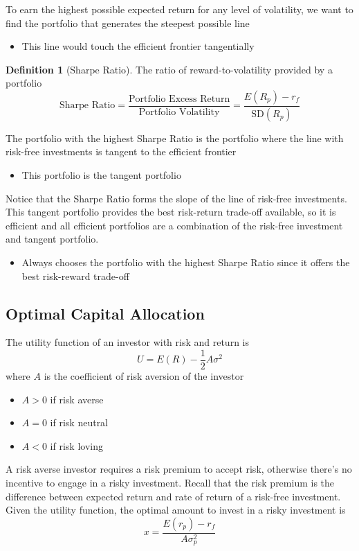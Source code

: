 \documentclass[11pt]{article}
\theoremstyle{definition}
\newtheorem*{definition}{Definition}
\newcommand{\Sd}{\text{SD}}
\begin{document}
To earn the highest possible expected return for any level of volatility, we want to find the portfolio that generates the steepest possible line 
\begin{itemize}
    \item This line would touch the efficient frontier tangentially
\end{itemize}
\begin{definition}[Sharpe Ratio]
    The ratio of reward-to-volatility provided by a portfolio
    \begin{equation*}
        \text{Sharpe Ratio} = \frac{\text{Portfolio Excess Return}}{\text{Portfolio Volatility}} = \frac{E(R_p) - r_f}{\Sd(R_p)}
    \end{equation*}
\end{definition}
The portfolio with the highest Sharpe Ratio is the portfolio where the line with risk-free investments is tangent to the efficient frontier
\begin{itemize}
    \item This portfolio is the tangent portfolio
\end{itemize}
Notice that the Sharpe Ratio forms the slope of the line of risk-free investments. This tangent portfolio provides the best risk-return trade-off available, so it is efficient and all efficient portfolios are a combination of the risk-free investment and tangent portfolio.
\begin{itemize}
    \item Always chooses the portfolio with the highest Sharpe Ratio since it offers the best risk-reward trade-off
\end{itemize}


\subsection{Optimal Capital Allocation}
The utility function of an investor with risk and return is 
\begin{equation*}
    U = E(R) - \frac{1}{2}A\sigma^2 
\end{equation*}
where $A$ is the coefficient of risk aversion of the investor
\begin{itemize}
    \item $A > 0$ if risk averse
    \item $A = 0$ if risk neutral
    \item $A < 0$ if risk loving
\end{itemize}
A risk averse investor requires a risk premium to accept risk, otherwise there's no incentive to engage in a risky investment. Recall that the risk premium is the difference between expected return and rate of return of a risk-free investment. Given the utility function, the optimal amount to invest in a risky investment is 
\begin{equation*}
    x = \frac{E(r_p) - r_f}{A\sigma_p^2}
\end{equation*}
\end{document}
